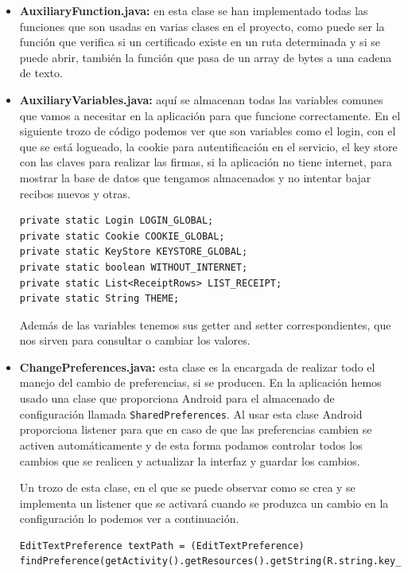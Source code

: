 \begin{itemize}

\item \textbf{AuxiliaryFunction.java:} en esta clase se han implementado todas las funciones que son usadas en varias clases en el proyecto, como puede ser la función que verifica si un certificado existe en un ruta determinada y si se puede abrir, también la función que pasa de un array de bytes a una cadena de texto. 

\item \textbf{AuxiliaryVariables.java:} aquí se almacenan todas las variables comunes que vamos a necesitar en la aplicación para que funcione correctamente. En el siguiente trozo de código podemos ver que son variables como el login, con el que se está logueado, la cookie para autentificación en el servicio, el key store con las claves para realizar las firmas, si la aplicación no tiene internet, para mostrar la base de datos que tengamos almacenados y no intentar bajar recibos nuevos y otras.

\begin{lstlisting}[style=Java]
private static Login LOGIN_GLOBAL;
private static Cookie COOKIE_GLOBAL;
private static KeyStore KEYSTORE_GLOBAL;
private static boolean WITHOUT_INTERNET;
private static List<ReceiptRows> LIST_RECEIPT;
private static String THEME;
\end{lstlisting}

Además de las variables tenemos sus getter and setter correspondientes, que nos sirven para consultar o cambiar los valores.

\item \textbf{ChangePreferences.java:} esta clase es la encargada de realizar todo el manejo del cambio de preferencias, si se producen. En la aplicación hemos usado una clase que proporciona Android para el almacenado de configuración llamada \lstinline{SharedPreferences}. Al usar esta clase Android proporciona listener para que en caso de que las preferencias cambien se activen automáticamente y de esta forma podamos controlar todos los cambios que se realicen y actualizar la interfaz y guardar los cambios.

Un trozo de esta clase, en el que se puede observar como se crea y se implementa un listener que se activará cuando se produzca un cambio en la configuración lo podemos ver a continuación.

\begin{lstlisting}[style=Java]
EditTextPreference textPath = (EditTextPreference) findPreference(getActivity().getResources().getString(R.string.key_cert_path));


\end{lstlisting}
\end{itemize}
